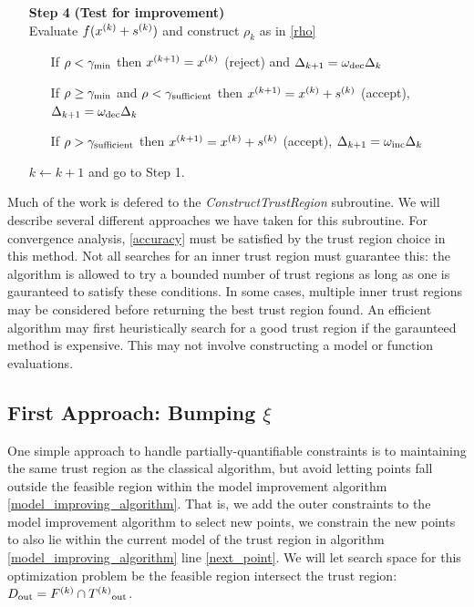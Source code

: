 \begin{algorithm}[H]
\begin{itemize}
        \item[\textbf{Step 4}] \textbf{(Test for improvement)} \\
            Evaluate $f({x}^{(k)} + {s}^{(k)})$ and construct $\rho_k$ as in \ref{rho} \begin{itemize}
                \item[] If $\rho < \gamma_{\text{min}}$ then ${x}^{(k+1)}={x}^{(k)}$ (reject) and $\Delta_{k+1} = \omega_{\text{dec}}\Delta_{k}$
                \item[] If $\rho \ge \gamma_{\text{min}}$ and $\rho < \gamma_{\text{sufficient}}$ then ${x}^{(k+1)}={x}^{(k)}+{s}^{(k)}$ (accept), $\Delta_{k+1} = \omega_{\text{dec}}\Delta_{k}$
                \item[] If $\rho > \gamma_{\text{sufficient}}$ then ${x}^{(k+1)}={x}^{(k)}+{s}^{(k)}$ (accept), $\Delta_{k+1} = \omega_{\text{inc}}\Delta_{k}$
            \end{itemize}
            $k \gets k+1$ and go to Step 1.
    \end{itemize}
\end{algorithm}

Much of the work is defered to the \emph{ConstructTrustRegion} subroutine.
We will describe several different approaches we have taken for this subroutine.
For convergence analysis, \ref{accuracy} must be satisfied by the trust region choice in this method.
Not all searches for an inner trust region must guarantee this: the algorithm is allowed to try a bounded number of trust regions as long as one is gauranteed to satisfy these conditions.
In some cases, multiple inner trust regions may be considered before returning the best trust region found.
An efficient algorithm may first heuristically search for a good trust region if the garaunteed method is expensive.
This may not involve constructing a model or function evaluations.


\subsection{First Approach: Bumping $\xi$}
One simple approach to handle partially-quantifiable constraints is to maintaining the same trust region as the classical algorithm, but avoid letting points fall outside the feasible region within the model improvement algorithm \ref{model_improving_algorithm}.
That is, we add the outer constraints to the model improvement algorithm to select new points, we constrain the new points to also lie within the current model of the trust region in algorithm \ref{model_improving_algorithm} line \ref{next_point}.
We will let search space for this optimization problem be the feasible region intersect the trust region: $D_{\text{out}} = {F}^{(k)} \cap {T^{(k)}}_{\text{out}} $.

